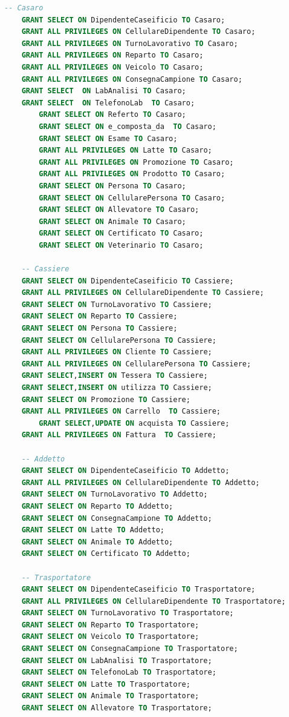 \documentclass[12pt]{report}
\begin{document}
\begin{lstlisting}[language=SQL,caption={DCL\_UTENTI}]
	-- Casaro
	GRANT SELECT ON DipendenteCaseificio TO Casaro;
	GRANT ALL PRIVILEGES ON CellulareDipendente TO Casaro;
	GRANT ALL PRIVILEGES ON TurnoLavorativo TO Casaro;
	GRANT ALL PRIVILEGES ON Reparto TO Casaro;
	GRANT ALL PRIVILEGES ON Veicolo TO Casaro;
	GRANT ALL PRIVILEGES ON ConsegnaCampione TO Casaro;
	GRANT SELECT  ON LabAnalisi TO Casaro;
	GRANT SELECT  ON TelefonoLab  TO Casaro;
        GRANT SELECT ON Referto TO Casaro;
        GRANT SELECT ON e_composta_da  TO Casaro;
        GRANT SELECT ON Esame TO Casaro;
        GRANT ALL PRIVILEGES ON Latte TO Casaro;
        GRANT ALL PRIVILEGES ON Promozione TO Casaro;
        GRANT ALL PRIVILEGES ON Prodotto TO Casaro;
        GRANT SELECT ON Persona TO Casaro;
        GRANT SELECT ON CellularePersona TO Casaro;
        GRANT SELECT ON Allevatore TO Casaro;
        GRANT SELECT ON Animale TO Casaro;
        GRANT SELECT ON Certificato TO Casaro;
        GRANT SELECT ON Veterinario TO Casaro;
	
	-- Cassiere
	GRANT SELECT ON DipendenteCaseificio TO Cassiere;
	GRANT ALL PRIVILEGES ON CellulareDipendente TO Cassiere;
	GRANT SELECT ON TurnoLavorativo TO Cassiere;
	GRANT SELECT ON Reparto TO Cassiere;
	GRANT SELECT ON Persona TO Cassiere;
	GRANT SELECT ON CellularePersona TO Cassiere;
	GRANT ALL PRIVILEGES ON Cliente TO Cassiere;
	GRANT ALL PRIVILEGES ON CellularePersona TO Cassiere;
	GRANT SELECT,INSERT ON Tessera TO Cassiere;
	GRANT SELECT,INSERT ON utilizza TO Cassiere;
	GRANT SELECT ON Promozione TO Cassiere;
	GRANT ALL PRIVILEGES ON Carrello  TO Cassiere;
        GRANT SELECT,UPDATE ON acquista TO Cassiere;
	GRANT ALL PRIVILEGES ON Fattura  TO Cassiere;
	
	-- Addetto
	GRANT SELECT ON DipendenteCaseificio TO Addetto;
	GRANT ALL PRIVILEGES ON CellulareDipendente TO Addetto;
	GRANT SELECT ON TurnoLavorativo TO Addetto;
	GRANT SELECT ON Reparto TO Addetto;
	GRANT SELECT ON ConsegnaCampione TO Addetto;
	GRANT SELECT ON Latte TO Addetto;
	GRANT SELECT ON Animale TO Addetto;
	GRANT SELECT ON Certificato TO Addetto;
	
	-- Trasportatore
	GRANT SELECT ON DipendenteCaseificio TO Trasportatore;
	GRANT ALL PRIVILEGES ON CellulareDipendente TO Trasportatore;
	GRANT SELECT ON TurnoLavorativo TO Trasportatore;
	GRANT SELECT ON Reparto TO Trasportatore;
	GRANT SELECT ON Veicolo TO Trasportatore;
	GRANT SELECT ON ConsegnaCampione TO Trasportatore;
	GRANT SELECT ON LabAnalisi TO Trasportatore;
	GRANT SELECT ON TelefonoLab TO Trasportatore;
	GRANT SELECT ON Latte TO Trasportatore;
	GRANT SELECT ON Animale TO Trasportatore;
	GRANT SELECT ON Allevatore TO Trasportatore;
	

\end{lstlisting}
\end{document}

